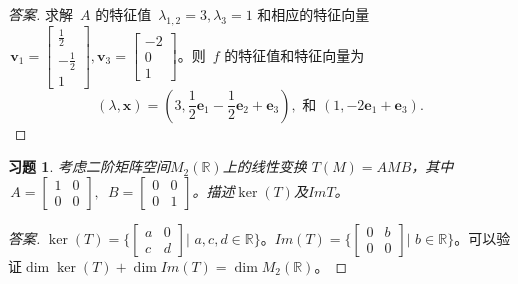 \documentclass[UTF8]{ctexart}
\newtheorem{ex}[thm]{习题}
\begin{document}
\begin{proof}[答案]
求解 $\,A$ 的特征值 $\,\lambda_{1,2} = 3, \lambda_3 = 1$ 和相应的特征向量 $\,\boldsymbol{v}_1 = \left[\begin{array}{c} \frac12 \\-\frac12 \\1\end{array} \right],
\boldsymbol{v}_3 = \left[\begin{array}{c} -2 \\0 \\1\end{array} \right]$。则 $\,f$ 的特征值和特征向量为
\[
(\lambda, \boldsymbol{x}) = (3, \frac12 \boldsymbol{e}_1 -\frac12 \boldsymbol{e}_2 + \boldsymbol{e}_3), 
\text{ 和 } (1, -2 \boldsymbol{e}_1 + \boldsymbol{e}_3).
\]
\end{proof}





	
\begin{ex}
考虑二阶矩阵空间$M_2(\mathbb{R})$上的线性变换
$T(M)=AMB$，其中$\,A = \left[\begin{array}{cc} 1 & 0\\ 0& 0\end{array}\right],$ $\,B = \left[\begin{array}{cc} 0 & 0\\ 0& 1\end{array}\right]$。描述$\ker (T)$及$Im T$。 
\end{ex}
\begin{proof}[答案]
$\ker(T)=\big\{\left[\begin{array}{cc} a & 0\\ c& d\end{array}\right]|\,\, a,c,d\in\mathbb{R}\big\}$。$Im (T)=\big\{\left[\begin{array}{cc} 0 & b\\ 0& 0\end{array}\right]|\,\, b\in\mathbb{R}\big\}$。可以验证$\dim \ker(T)+\dim Im(T)=\dim M_2(\mathbb{R})$。
\end{proof}
		
\end{document}
